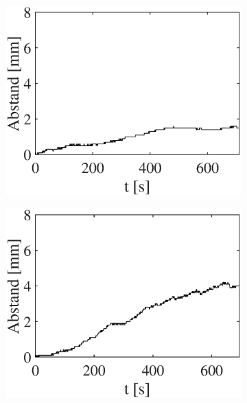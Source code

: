 \documentclass[doc,a4paper,12pt]{apa6}
\begin{document}
\begin{figure}
\begin{subfigure}[c]{0.23\textwidth}
    \label{img:bewegung:pa07:3}
  \end{subfigure}\hspace*{0.02\textwidth}
  \begin{subfigure}[c]{0.23\textwidth}
    \includegraphics[width=\textwidth]{ergebnisse/movement/pa07a4_mc_dist_movement.eps}
    \label{img:bewegung:pa07:4}
  \end{subfigure}\hspace*{0.02\textwidth}
  \begin{subfigure}[c]{0.23\textwidth}
    \includegraphics[width=\textwidth]{ergebnisse/movement/pa07a6_mc_dist_movement.eps}

\end{subfigure}
\end{figure}
\end{document}
